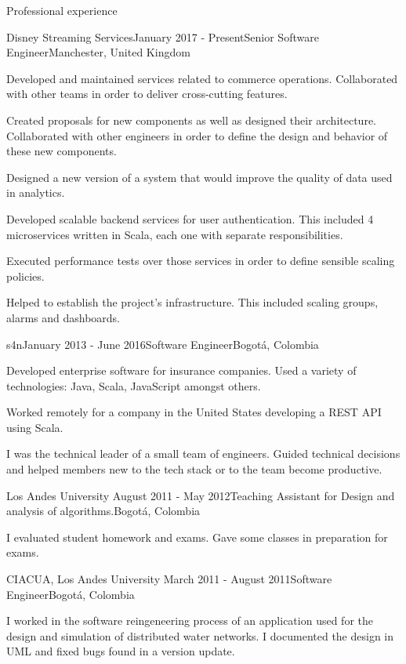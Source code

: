 \documentclass{resume} %
\def\uniandes{Los Andes University }
\begin{document}
\begin{rSection}{Professional experience}

\begin{rSubsection}{Disney Streaming Services}{January 2017 - Present}{Senior Software Engineer}{Manchester, United Kingdom}
\item Developed and maintained services related to commerce operations. Collaborated with other teams in order to deliver cross-cutting features.
\item Created proposals for new components as well as designed their architecture. Collaborated with other engineers in order to define the design and behavior of these new components.
\item Designed a new version of a system that would improve the quality of data used in analytics.
\item Developed scalable backend services for user authentication. This included 4 microservices written in Scala, each one with separate responsibilities.
\item Executed performance tests over those services in order to define sensible scaling policies.
\item Helped to establish the project's infrastructure. This included scaling groups, alarms and dashboards.
\end{rSubsection}

\begin{rSubsection}{s4n}{January 2013 - June 2016}{Software Engineer}{Bogot\'a, Colombia}
\item Developed enterprise software for insurance companies. Used a variety of technologies: Java, Scala, JavaScript amongst others.
\item Worked remotely for a company in the United States developing a REST API using Scala.
\item I was the technical leader of a small team of engineers. Guided technical decisions and helped members new to the tech stack or to the team become productive.
\end{rSubsection}


\begin{rSubsection}{\uniandes}{August 2011 - May 2012}{Teaching Assistant for Design and analysis of algorithms.}{Bogot\'a, Colombia}
\item I evaluated student homework and exams. Gave some classes in preparation for exams.
\end{rSubsection}


\begin{rSubsection}{CIACUA, \uniandes}{March 2011 - August 2011}{Software Engineer}{Bogot\'a, Colombia}
\item I worked in the software reingeneering process of an application used for the design and simulation of distributed water networks. I documented the design in UML and fixed bugs found in a version update.
\end{rSubsection}

\end{rSection}
\end{document}
